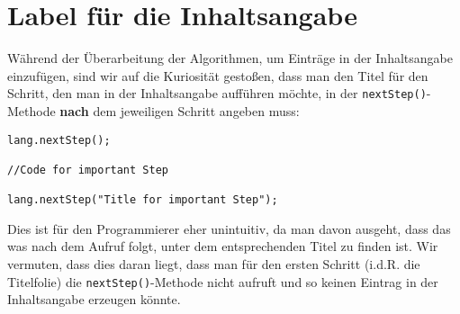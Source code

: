 \documentclass[solution]{tudreport}
\begin{document}
		\section{Label für die Inhaltsangabe}
			Während der Überarbeitung der Algorithmen, um Einträge in der Inhaltsangabe einzufügen, sind wir auf die Kuriosität gestoßen, dass man den Titel für den Schritt, den man in der Inhaltsangabe aufführen möchte, in der \lstinline!nextStep()!-Methode \textbf{nach} dem jeweiligen Schritt angeben muss:
			\begin{lstlisting}[frame=single, caption = Code-Beispiel für die Angabe des Titels nach dem Code]
lang.nextStep();

//Code for important Step

lang.nextStep("Title for important Step");
			\end{lstlisting}
			Dies ist für den Programmierer eher unintuitiv, da man davon ausgeht, dass das was nach dem Aufruf folgt, unter dem entsprechenden Titel zu finden ist. Wir vermuten, dass dies daran liegt, dass man für den ersten Schritt (i.d.R. die Titelfolie) die \lstinline!nextStep()!-Methode nicht aufruft und so keinen Eintrag in der Inhaltsangabe erzeugen könnte.
\end{document}
